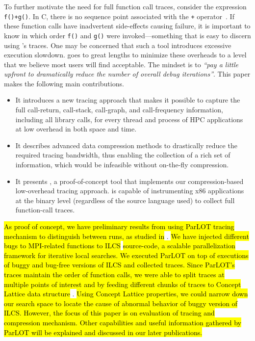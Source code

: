 To further motivate the need for full function call
traces, consider the expression {\tt f()+g()}.
%
In C, there is no sequence point associated with the {\tt +}
operator~\cite{sequence-points-in-C}.
%
If these function calls have inadvertent side-effects causing 
failure, it is important to know in which order {\tt f()}
and {\tt g()} were invoked---something that is easy to discern using
\parlot 's traces.
%
One may be concerned that such a tool introduces excessive execution slowdown.
%
\parlot goes to great lengths to minimize these overheads to a level that we believe most users will find acceptable. The mindset is to \textit{``pay a little upfront to dramatically reduce the number of overall debug iterations''}. 
%
This paper makes the following main contributions.
%
\begin{itemize}
\item It introduces a new tracing approach that makes it possible to capture the full call-return, call-stack, call-graph, and call-frequency information, including all library calls, for every thread and process of HPC applications at low overhead in both space and time.
\item It describes advanced data compression methods to drastically reduce the required tracing bandwidth, thus enabling the collection of a rich set of information, which would be infeasible without on-the-fly compression.
\item It presents \parlot, a proof-of-concept tool that implements our compression-based low-overhead tracing approach. \parlot is capable of instrumenting x86 applications at the binary level (regardless of the source language used) to collect full function-call traces.
\end{itemize}
%
\hl{As proof of concept, we have preliminary results from using ParLOT tracing mechanism to distinguish between runs, as studied in} \citep{cstg}.
%
\hl{We have injected different bugs to MPI-related functions to ILCS} \cite{ilcs} \hl{source-code, a scalable parallelization framework for iterative local searches.
%
We executed ParLOT on top of executions of buggy and bug-free versions of ILCS and collected traces.
%
Since ParLOT's traces maintain the order of function calls, we were able to split traces at multiple points of interest and by feeding different chunks of traces to Concept Lattice data structure} \cite{clbook} \cite{clconst}. 
%
\hl{Using Concept Lattice properties, we could narrow down our search space to locate the cause of abnormal behavior of buggy version of ILCS.
%
However, the focus of this paper is on evaluation of tracing and compression mechanism.
%
Other capabilities and useful information gathered by ParLOT will be explained and discussed in our later publications.}

